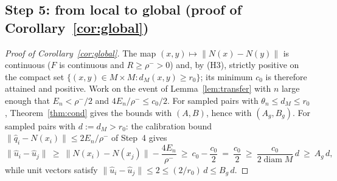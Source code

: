 \documentclass[11pt]{article}
\theoremstyle{remark}
\begin{document}
\subsection*{Step 5: from local to global (proof of Corollary~\ref{cor:global})}
\begin{proof}[Proof of Corollary~\ref{cor:global}]
The map $(x,y)\mapsto\lVert N(x)-N(y)\rVert$ is continuous ($F$ is continuous
and $R\ge\rho^->0$) and, by (H3), strictly positive on the compact set
$\{(x,y)\in M\times M: d_M(x,y)\ge r_0\}$; its minimum $c_0$ is therefore
attained and positive. Work on the event of Lemma~\ref{lem:transfer} with $n$
large enough that $E_n<\rho^-/2$ and $4E_n/\rho^-\le c_0/2$. For sampled pairs
with $\theta_n\le d_M\le r_0$, Theorem~\ref{thm:cond} gives the bounds with
$(A,B)$, hence with $(A_g,B_g)$. For sampled pairs with $d:=d_M>r_0$: the
calibration bound $\lVert\hat q_i-N(x_i)\rVert\le2E_n/\rho^-$ of Step~4 gives
\[
\lVert\hat u_i-\hat u_j\rVert
\ \ge\ \lVert N(x_i)-N(x_j)\rVert-\frac{4E_n}{\rho^-}
\ \ge\ c_0-\frac{c_0}{2}\ =\ \frac{c_0}{2}
\ \ge\ \frac{c_0}{2\operatorname{diam}M}\,d\ \ge\ A_g\,d,
\]
while unit vectors satisfy
$\lVert\hat u_i-\hat u_j\rVert\le2\le(2/r_0)\,d\le B_g\,d$.
\end{proof}
\end{document}
